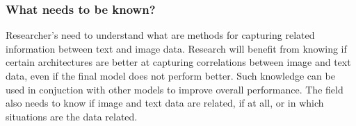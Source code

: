 \subsubsection{What needs to be known?}

Researcher's need to understand what are methods for capturing related information between text and image data.  Research will benefit from knowing if certain architectures are better at capturing correlations between image and text data, even if the final model does not perform better.  Such knowledge can be used in conjuction with other models to improve overall performance.  The field also needs to know if image and text data are related, if at all, or in which situations are the data related.  
